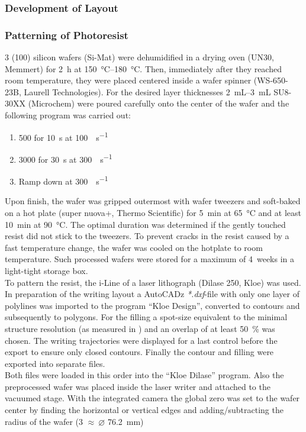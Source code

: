 \subsubsection{Development of Layout}

\subsubsection{Patterning of Photoresist}
\SI{3}{\inch} (100) silicon wafers (Si-Mat) were dehumidified in a drying oven (UN30, Memmert) for \SI{2}{\hour} at \SIrange{150}{180}{\degreeCelsius}. Then, immediately after they reached room temperature, they were placed centered inside a wafer spinner (WS-650-23B, Laurell Technologies). For the desired layer thicknesses \SIrange{2}{3}{\milli\liter} SU8-30XX (Microchem) were poured carefully onto the center of the wafer and the following program was carried out:
\begin{enumerate}[noitemsep]
\item \SI{500}{\rpm} for \SI{10}{s} at \SI{100}{\rpm\per\second}
\item \SI{3000}{\rpm} for \SI{30}{s} at \SI{300}{\rpm\per\second}
\item Ramp down at \SI{300}{\rpm\per\second}
\end{enumerate}
Upon finish, the wafer was gripped outermost with wafer tweezers and soft-baked on a hot plate (super nuova+, Thermo Scientific) for \SI{5}{\minute} at \SI{65}{\degreeCelsius} and at least \SI{10}{\minute} at \SI{90}{\degreeCelsius}. The optimal duration was determined if the gently touched resist did not stick to the tweezers. To prevent cracks in the resist caused by a fast temperature change, the wafer was cooled on the hotplate to room	temperature. Such processed wafers were stored for a maximum of \SI{4}{weeks} in a light-tight storage box.\\
To pattern the resist, the i-Line of a laser lithograph (Dilase 250, Kloe) was used. In preparation of the writing layout a AutoCADz \textit{*.dxf}-file with only one layer of polylines was imported to the program ``Kloe Design'', converted to contours and subsequently to polygons. For the filling a spot-size equivalent to the minimal structure resolution (as measured in \citet{lit:tech:rojda2020}) and an overlap of at least \SI{50}{\percent} was chosen. The writing trajectories were displayed for a last control before the export to ensure only closed contours. Finally the contour and filling were exported into separate files.\\
Both files were loaded in this order into the ``Kloe Dilase'' program. Also the preprocessed wafer was placed inside the laser writer and attached to the vacuumed stage. With the integrated camera the global zero was set to the wafer center by finding the horizontal or vertical edges and adding/subtracting the radius of the wafer (\SI{3}{\inch} $\approx\ \varnothing $  \SI{76.2}{\milli\meter}) 

